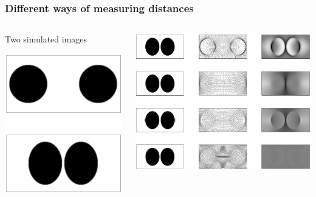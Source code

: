 \documentclass{beamer}
\begin{document}
\begin{frame}
\begin{columns}[c]
\end{columns}
\end{frame}

\begin{frame}
\frametitle{Different ways of measuring distances}
\begin{columns}[c]
\begin{center}
Two simulated images\par
\includegraphics[width=\textwidth]{figure2Di}
\end{center}
\includegraphics[width=\textwidth]{figure2Dii}
\end{columns}
\end{frame}
\end{document}
